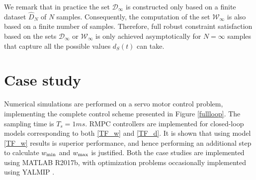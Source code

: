 \documentclass[letterpaper, 10 pt, conference]{ieeeconf}  %
\begin{document}
We remark that in practice the set $\mathcal{D}_{\infty}$ is constructed only based on a finite dataset $\hat{D}_{N}$ of $N$ samples. Consequently, the computation of the set $\mathcal{W}_{\infty}$ is also based  on a finite number of samples. Therefore, full robust
constraint satisfaction based on the sets $\mathcal{D}_{\infty}$ or $\mathcal{W}_{\infty}$
is only achieved asymptotically for $N=\infty$ samples
that capture all the possible values $d_S(t)$ can take.

\section{Case study}
	Numerical simulations are performed on a servo motor control problem, implementing the complete control scheme presented in Figure \ref{fullloop}. The sampling time is $T_s = 1 ms$. RMPC controllers are implemented for closed-loop models corresponding to both \eqref{TF_w} and \eqref{TF_d}. It is shown that using model \eqref{TF_w} results is superior performance, and hence performing an additional step to calculate $w_{\rm min}$ and $w_{\rm max}$ is justified.
	Both the case studies are implemented using MATLAB R2017b, with optimization problems occasionally implemented using YALMIP \cite{Lofberg2004}.
	\label{Case studies}
	\iffalse
\end{document}
